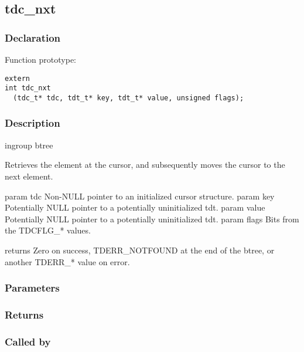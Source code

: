 
\newpage
\subsection{tdc\_nxt}
\subsubsection{Declaration} Function prototype:

\begin{verbatim}
extern
int tdc_nxt
  (tdc_t* tdc, tdt_t* key, tdt_t* value, unsigned flags);
\end{verbatim}

\subsubsection{Description}


 ingroup btree

 Retrieves the element at the cursor, and subsequently moves the cursor
 to the next element.

 param tdc Non-NULL pointer to an initialized cursor structure.
 param key Potentially NULL pointer to a potentially uninitialized tdt.
 param value Potentially NULL pointer to a potentially uninitialized tdt.
 param flags Bits from the TDCFLG\_* values.

 returns Zero on success, TDERR\_NOTFOUND at the end of the btree,
 or another TDERR\_* value on error.
 

\subsubsection{Parameters}
\subsubsection{Returns}
\subsubsection{Called by}
